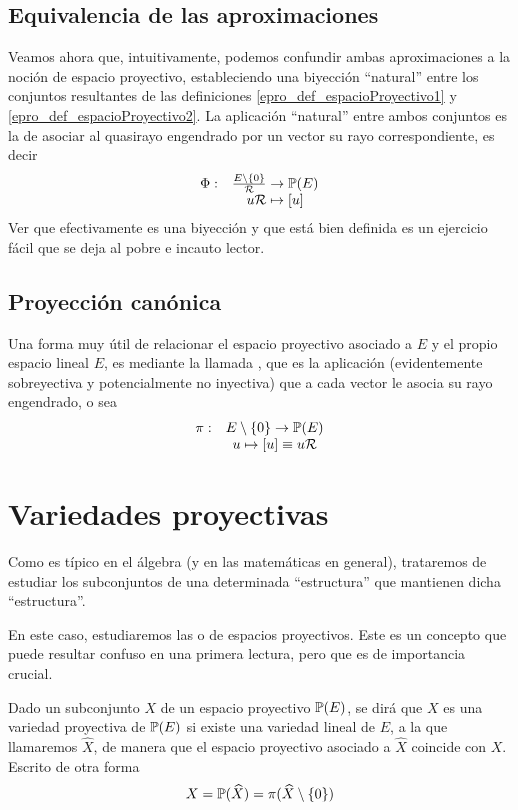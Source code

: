 \subsection{Equivalencia de las aproximaciones}
Veamos ahora que, intuitivamente, podemos confundir ambas aproximaciones a la noción de espacio proyectivo, estableciendo una biyección ``natural'' entre los conjuntos resultantes de las definiciones \ref{epro_def_espacioProyectivo1} y \ref{epro_def_espacioProyectivo2}. La aplicación ``natural'' entre ambos conjuntos es la de asociar al quasirayo engendrado por un vector su rayo correspondiente, es decir
\begin{equation*}
	\begin{array}{cc}
	\Phi:&\frac{E\setminus\{0\}}{\mathcal{R}}\to\mathbb{P}(E)\\
	&u\mathcal{R}\mapsto\left [ u \right ]
	\end{array}
\end{equation*}
Ver que efectivamente es una biyección y que está bien definida es un ejercicio fácil que se deja al pobre e incauto lector.
\subsection{Proyección canónica}
Una forma muy útil de relacionar el espacio proyectivo asociado a $E$ y el propio espacio lineal $E$, es mediante la llamada , que es la aplicación (evidentemente sobreyectiva y potencialmente no inyectiva) que a cada vector le asocia su rayo engendrado, o sea
\begin{equation*}
	\begin{array}{cc}
	\pi:&E\setminus\{0\}\to\mathbb{P}(E)\\
	&u\mapsto\left [ u \right ]\equiv u\mathcal{R}
	\end{array}
\end{equation*}
\section{Variedades proyectivas}
Como es típico en el álgebra (y en las matemáticas en general), trataremos de estudiar los subconjuntos de una determinada ``estructura'' que mantienen dicha ``estructura''.

En este caso, estudiaremos las  o  de espacios proyectivos. Este es un concepto que puede resultar confuso en una primera lectura, pero que es de importancia crucial.
\begin{defi}
	\label{epro_def_variedades}
	Dado un subconjunto $X$ de un espacio proyectivo $\mathbb{P}(E)$, se dirá que $X$ es una variedad proyectiva de $\mathbb{P}(E)$ si existe una variedad lineal de $E$, a la que llamaremos $\widehat{X}$, de manera que el espacio proyectivo asociado a $\widehat{X}$ coincide con $X$. Escrito de otra forma
	\begin{equation*}
		X=\mathbb{P}(\widehat{X})=\pi(\widehat{X}\setminus\{0\})
	\end{equation*}
\end{defi}

